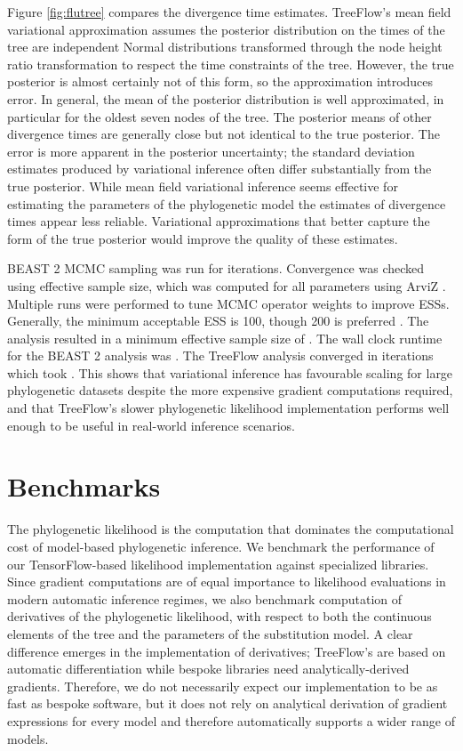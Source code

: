 Figure \ref{fig:flutree} compares the divergence time estimates. TreeFlow's mean field variational approximation assumes the posterior distribution on the times of the tree are independent Normal distributions transformed through the node height ratio transformation to respect the time constraints of the tree. However, the true posterior is almost certainly not of this form, so the approximation introduces error. In general, the mean of the posterior distribution is well approximated, in particular for the oldest seven nodes of the tree. The posterior means of other divergence times are generally close but not identical to the true posterior. The error is more apparent in the posterior uncertainty; the standard deviation estimates produced by variational inference often differ substantially from the true posterior. While mean field variational inference seems effective for estimating the parameters of the phylogenetic model the estimates of divergence times appear less reliable. Variational approximations that better capture the form of the true posterior would improve the quality of these estimates.

BEAST 2 MCMC sampling was run for  iterations. Convergence was checked using effective sample size, which was computed for all parameters using ArviZ \cite{kumar2019arviz}. Multiple runs were performed to tune MCMC operator weights to improve ESSs. Generally, the minimum acceptable ESS is 100, though 200 is preferred \cite{drummond2015bayesian}. The analysis resulted in a minimum effective sample size of . The wall clock runtime for the BEAST 2 analysis was . The TreeFlow analysis converged in  iterations which took . This shows that variational inference has favourable scaling for large phylogenetic datasets despite the more expensive gradient computations required, and that TreeFlow's slower phylogenetic likelihood implementation performs well enough to be useful in real-world inference scenarios.

\section{Benchmarks}

The phylogenetic likelihood is the computation that dominates the computational cost of model-based phylogenetic inference. We benchmark the performance of our TensorFlow-based likelihood implementation against specialized libraries. Since gradient computations are of equal importance to likelihood evaluations in modern automatic inference regimes, we also benchmark computation of derivatives of the phylogenetic likelihood, with respect to both the continuous elements of the tree and the parameters of the substitution model. A clear difference emerges in the implementation of derivatives; TreeFlow's are based on automatic differentiation while bespoke libraries need analytically-derived gradients. Therefore, we do not necessarily expect our implementation to be as fast as bespoke software, but it does not rely on analytical derivation of gradient expressions for every model and therefore automatically supports a wider range of models.

